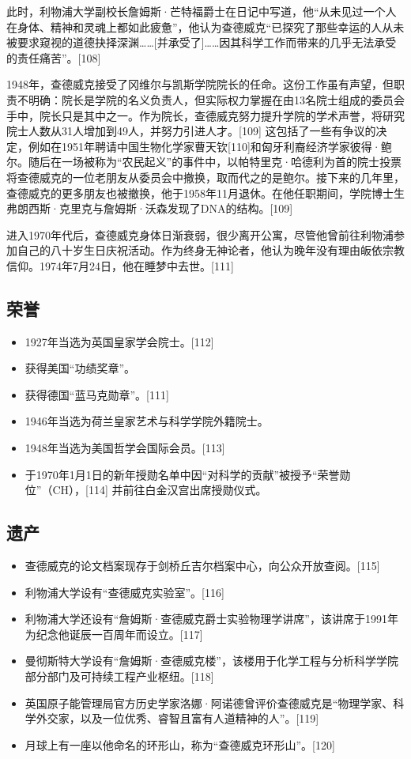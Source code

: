 此时，利物浦大学副校长詹姆斯·芒特福爵士在日记中写道，他“从未见过一个人在身体、精神和灵魂上都如此疲惫”，他认为查德威克“已探究了那些幸运的人从未被要求窥视的道德抉择深渊……[并承受了]……因其科学工作而带来的几乎无法承受的责任痛苦”。[108]

1948年，查德威克接受了冈维尔与凯斯学院院长的任命。这份工作虽有声望，但职责不明确：院长是学院的名义负责人，但实际权力掌握在由13名院士组成的委员会手中，院长只是其中之一。作为院长，查德威克努力提升学院的学术声誉，将研究院士人数从31人增加到49人，并努力引进人才。[109] 这包括了一些有争议的决定，例如在1951年聘请中国生物化学家曹天钦[110]和匈牙利裔经济学家彼得·鲍尔。随后在一场被称为“农民起义”的事件中，以帕特里克·哈德利为首的院士投票将查德威克的一位老朋友从委员会中撤换，取而代之的是鲍尔。接下来的几年里，查德威克的更多朋友也被撤换，他于1958年11月退休。在他任职期间，学院博士生弗朗西斯·克里克与詹姆斯·沃森发现了DNA的结构。[109]

进入1970年代后，查德威克身体日渐衰弱，很少离开公寓，尽管他曾前往利物浦参加自己的八十岁生日庆祝活动。作为终身无神论者，他认为晚年没有理由皈依宗教信仰。1974年7月24日，他在睡梦中去世。[111]
\subsection{荣誉}
\begin{itemize}
\item 1927年当选为英国皇家学会院士。[112]
\item 获得美国“功绩奖章”。
\item 获得德国“蓝马克勋章”。[111]
\item 1946年当选为荷兰皇家艺术与科学学院外籍院士。
\item 1948年当选为美国哲学会国际会员。[113]
\item 于1970年1月1日的新年授勋名单中因“对科学的贡献”被授予“荣誉勋位”（CH），[114] 并前往白金汉宫出席授勋仪式。
\end{itemize}
\subsection{遗产}
\begin{itemize}
\item 查德威克的论文档案现存于剑桥丘吉尔档案中心，向公众开放查阅。[115]
\item 利物浦大学设有“查德威克实验室”。[116]
\item 利物浦大学还设有“詹姆斯·查德威克爵士实验物理学讲席”，该讲席于1991年为纪念他诞辰一百周年而设立。[117]
\item 曼彻斯特大学设有“詹姆斯·查德威克楼”，该楼用于化学工程与分析科学学院部分部门及可持续工程产业枢纽。[118]
\item 英国原子能管理局官方历史学家洛娜·阿诺德曾评价查德威克是“物理学家、科学外交家，以及一位优秀、睿智且富有人道精神的人”。[119]
\item 月球上有一座以他命名的环形山，称为“查德威克环形山”。[120]
\end{itemize}
